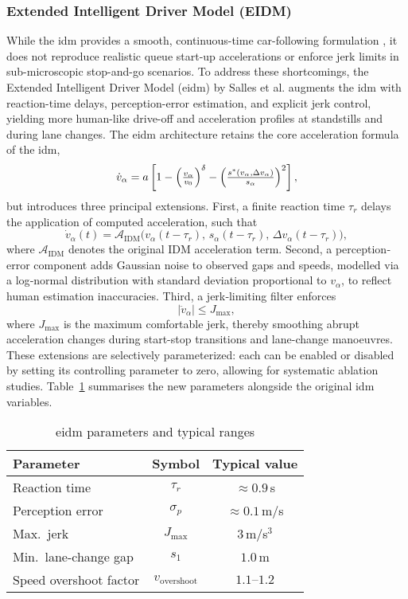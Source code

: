\subsubsection{Extended Intelligent Driver Model (EIDM)}
\label{subsubsec:eidm}
While the \ac{idm} provides a smooth, continuous-time car-following formulation \cite{Treiber_2000}, it does not reproduce realistic queue start-up accelerations or enforce jerk limits in sub-microscopic stop-and-go scenarios. To address these shortcomings, the Extended Intelligent Driver Model (\ac{eidm}) by Salles et al. \cite{Salles2022} augments the \ac{idm} with reaction-time delays, perception-error estimation, and explicit jerk control, yielding more human-like drive-off and acceleration profiles at standstills and during lane changes. \cite{Salles2022}
\mynewline
The \ac{eidm} architecture retains the core acceleration formula of the \ac{idm},
\[
\dot{v}_\alpha = a\left[1 - \Bigl(\tfrac{v_\alpha}{v_0}\Bigr)^\delta - \Bigl(\tfrac{s^*(v_\alpha,\Delta v_\alpha)}{s_\alpha}\Bigr)^2\right],
\]
but introduces three principal extensions. First, a finite reaction time $\tau_r$ delays the application of computed acceleration, such that
\[
\dot{v}_\alpha(t) = \mathcal{A}_\text{IDM}\bigl(v_\alpha(t-\tau_r),\,s_\alpha(t-\tau_r),\,\Delta v_\alpha(t-\tau_r)\bigr),
\]
where $\mathcal{A}_\text{IDM}$ denotes the original IDM acceleration term. Second, a perception‐error component adds Gaussian noise to observed gaps and speeds, modelled via a log‐normal distribution with standard deviation proportional to $v_\alpha$, to reflect human estimation inaccuracies. Third, a jerk‐limiting filter enforces
\[
|\ddot{v}_\alpha| \leq J_\text{max},
\]
where $J_\text{max}$ is the maximum comfortable jerk, thereby smoothing abrupt acceleration changes during start-stop transitions and lane-change manoeuvres.
\mynewline
These extensions are selectively parameterized: each can be enabled or disabled by setting its controlling parameter to zero, allowing for systematic ablation studies. Table~\ref{tab:eidm_params} summarises the new parameters alongside the original \ac{idm} variables.

\begin{table}[ht]
  \centering
  \caption{\ac{eidm} parameters and typical ranges \cite{Salles2022}}
  \label{tab:eidm_params}
  \begin{tabular}{lcc}
    \toprule
    Parameter            & Symbol             & Typical value  \\
    \midrule
    Reaction time        & $\tau_r$           & $\approx0.9\,$s    \\
    Perception error     & $\sigma_p$         &$\approx0.1\,$m/s  \\
    Max.\ jerk           & $J_\text{max}$     & $3\,$m/s$^3$ \\
    Min.\ lane-change gap & $s_1$             & $1.0\,$m    \\
    Speed overshoot factor & $v_\text{overshoot}$ & $1.1\text{–}1.2$  \\
    \bottomrule
  \end{tabular}
\end{table}

